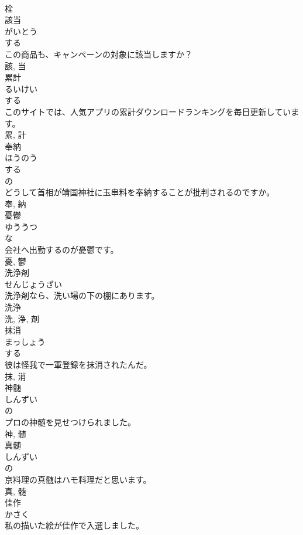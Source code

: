 \documentclass[8pt]{extreport}
\begin{document}
\begin{CJK}{UTF8}{min}
\\	栓	
\\	該当	
\\	がいとう	
\\	する 
\\	この商品も、キャンペーンの対象に該当しますか？	
\\	該, 当	
\\	累計	
\\	るいけい	
\\	する 
\\	このサイトでは、人気アプリの累計ダウンロードランキングを毎日更新しています。	
\\	累, 計	
\\	奉納	
\\	ほうのう	
\\	する 
\\	の 
\\	どうして首相が靖国神社に玉串料を奉納することが批判されるのですか。	
\\	奉, 納	
\\	憂鬱	
\\	ゆううつ	
\\	な 
\\	会社へ出勤するのが憂鬱です。	
\\	憂, 鬱	
\\	洗浄剤	
\\	せんじょうざい	
\\	洗浄剤なら、洗い場の下の棚にあります。	
\\	洗浄 
\\	洗, 浄, 剤	
\\	抹消	
\\	まっしょう	
\\	する 
\\	彼は怪我で一軍登録を抹消されたんだ。	
\\	抹, 消	
\\	神髄	
\\	しんずい	
\\	の 
\\	プロの神髄を見せつけられました。	
\\	神, 髄	
\\	真髄	
\\	しんずい	
\\	の 
\\	京料理の真髄はハモ料理だと思います。	
\\	真, 髄	
\\	佳作	
\\	かさく	
\\	私の描いた絵が佳作で入選しました。	

\end{CJK}
\end{document}
